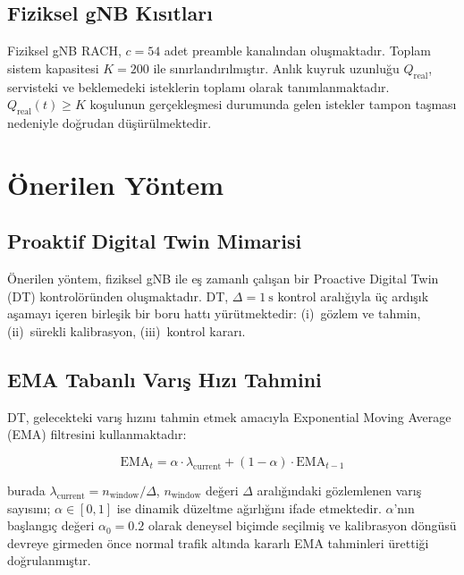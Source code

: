 \documentclass[conference]{IEEEtran}
\newcommand{\qreal}{Q_{\mathrm{real}}}
\newcommand{\ema}{\mathrm{EMA}}
\begin{document}
\subsection{Fiziksel gNB Kısıtları}

Fiziksel gNB RACH, $c = 54$ adet preamble kanalından oluşmaktadır. Toplam
sistem kapasitesi $K = 200$ ile sınırlandırılmıştır. Anlık kuyruk uzunluğu
$\qreal$, servisteki ve beklemedeki isteklerin toplamı olarak tanımlanmaktadır.
$\qreal(t) \geq K$ koşulunun gerçekleşmesi durumunda gelen istekler tampon
taşması nedeniyle doğrudan düşürülmektedir.

\section{Önerilen Yöntem}

\subsection{Proaktif Digital Twin Mimarisi}

Önerilen yöntem, fiziksel gNB ile eş zamanlı çalışan bir Proactive Digital Twin
(DT) kontrolöründen oluşmaktadır. DT, $\Delta = 1\ \mathrm{s}$ kontrol
aralığıyla üç ardışık aşamayı içeren birleşik bir boru hattı yürütmektedir:
(i)~gözlem ve tahmin, (ii)~sürekli kalibrasyon, (iii)~kontrol kararı.

\subsection{EMA Tabanlı Varış Hızı Tahmini}

DT, gelecekteki varış hızını tahmin etmek amacıyla Exponential Moving Average
(EMA) filtresini kullanmaktadır:

\begin{equation}
\ema_t = \alpha \cdot \lambda_{\mathrm{current}} + (1 - \alpha) \cdot \ema_{t-1}
\label{eq:ema}
\end{equation}

\noindent burada $\lambda_{\mathrm{current}} = n_{\mathrm{window}}/\Delta$,
$n_{\mathrm{window}}$ değeri $\Delta$ aralığındaki gözlemlenen varış sayısını;
$\alpha \in [0,1]$ ise dinamik düzeltme ağırlığını ifade etmektedir. $\alpha$'nın
başlangıç değeri $\alpha_0 = 0.2$ olarak deneysel biçimde seçilmiş ve
kalibrasyon döngüsü devreye girmeden önce normal trafik altında kararlı EMA
tahminleri ürettiği doğrulanmıştır.
\end{document}
